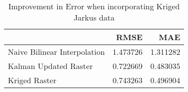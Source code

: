 \begin{table}[h!]
\caption{Improvement in Error when incorporating Kriged Jarkus data}
\label{tab:jarkus_kriging_kalman_error}
\begin{tabular}{lrr}
\toprule
 & RMSE & MAE \\
\midrule
Naive Bilinear Interpolation & 1.473726 & 1.311282 \\
Kalman Updated Raster & 0.722669 & 0.483035 \\
Kriged Raster & 0.743263 & 0.496904 \\
\bottomrule
\end{tabular}
\end{table}
